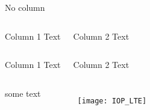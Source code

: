 \begin{frame}
\begin{centering}
No column


  \begin{columns}[c]

    
    Column 1 Text
    

    
    Column 2 Text
    

  \end{columns}


  \begin{columns}

    Column 1 Text


    Column 2 Text

  \end{columns}
\end{centering}

\end{frame}





\begin{frame}

\begin{columns}
some text


  \begin{figure}
    \centering
    \texttt{[image: IOP\_LTE]}
  \end{figure}

\end{columns}


\end{frame}

